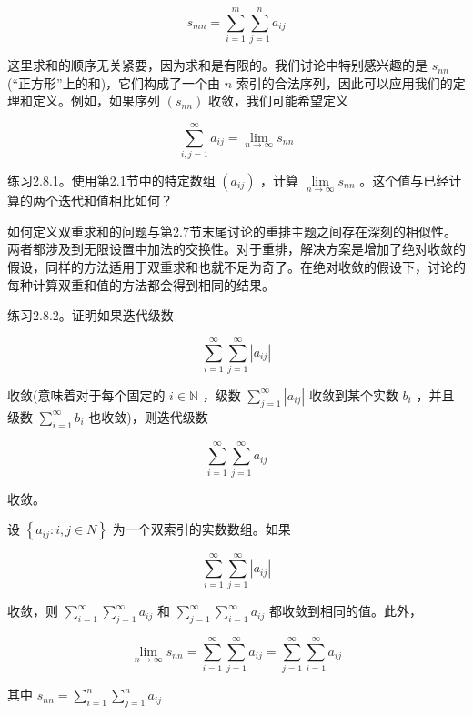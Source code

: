 \begin{equation}
\label{eq:2.3}
{s}_{mn} = \mathop{\sum }\limits_{{i = 1}}^{m}\mathop{\sum }\limits_{{j = 1}}^{n}{a}_{ij}
\end{equation}

这里求和的顺序无关紧要，因为求和是有限的。我们讨论中特别感兴趣的是 \({s}_{nn}\) (“正方形”上的和)，它们构成了一个由 \(n\) 索引的合法序列，因此可以应用我们的定理和定义。例如，如果序列 \(\left( {s}_{nn}\right)\) 收敛，我们可能希望定义

\[
\mathop{\sum }\limits_{{i,j = 1}}^{\infty }{a}_{ij} = \mathop{\lim }\limits_{{n \rightarrow  \infty }}{s}_{nn}
\]

练习2.8.1。使用第2.1节中的特定数组 \(\left( {a}_{ij}\right)\) ，计算 \(\mathop{\lim }\limits_{{n \rightarrow  \infty }}{s}_{nn}\) 。这个值与已经计算的两个迭代和值相比如何？

如何定义双重求和的问题与第2.7节末尾讨论的重排主题之间存在深刻的相似性。两者都涉及到无限设置中加法的交换性。对于重排，解决方案是增加了绝对收敛的假设，同样的方法适用于双重求和也就不足为奇了。在绝对收敛的假设下，讨论的每种计算双重和值的方法都会得到相同的结果。

练习2.8.2。证明如果迭代级数

\[
\mathop{\sum }\limits_{{i = 1}}^{\infty }\mathop{\sum }\limits_{{j = 1}}^{\infty }\left| {a}_{ij}\right|
\]

收敛(意味着对于每个固定的 \(i \in  \mathbb{N}\) ，级数 \(\mathop{\sum }\limits_{{j = 1}}^{\infty }\left| {a}_{ij}\right|\) 收敛到某个实数 \({b}_{i}\) ，并且级数 \(\mathop{\sum }\limits_{{i = 1}}^{\infty }{b}_{i}\) 也收敛)，则迭代级数

\[
\mathop{\sum }\limits_{{i = 1}}^{\infty }\mathop{\sum }\limits_{{j = 1}}^{\infty }{a}_{ij}
\]

收敛。

\begin{Thm}
  \label{thm:2.8.1}
  设 \(\left\{  {{a}_{ij} : i,j \in  N}\right\}\) 为一个双索引的实数数组。如果

\[
\mathop{\sum }\limits_{{i = 1}}^{\infty }\mathop{\sum }\limits_{{j = 1}}^{\infty }\left| {a}_{ij}\right|
\]

收敛，则 \(\mathop{\sum }\limits_{{i = 1}}^{\infty }\mathop{\sum }\limits_{{j = 1}}^{\infty }{a}_{ij}\) 和 \(\mathop{\sum }\limits_{{j = 1}}^{\infty }\mathop{\sum }\limits_{{i = 1}}^{\infty }{a}_{ij}\) 都收敛到相同的值。此外，

\[
\mathop{\lim }\limits_{{n \rightarrow  \infty }}{s}_{nn} = \mathop{\sum }\limits_{{i = 1}}^{\infty }\mathop{\sum }\limits_{{j = 1}}^{\infty }{a}_{ij} = \mathop{\sum }\limits_{{j = 1}}^{\infty }\mathop{\sum }\limits_{{i = 1}}^{\infty }{a}_{ij}
\]

其中 \({s}_{nn} = \mathop{\sum }\limits_{{i = 1}}^{n}\mathop{\sum }\limits_{{j = 1}}^{n}{a}_{ij}\)
\end{Thm}

